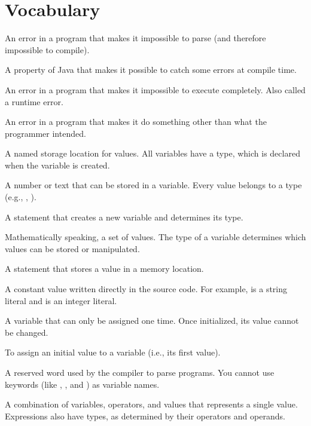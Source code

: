 \section{Vocabulary}

\begin{description}

An error in a program that makes it impossible to parse (and therefore impossible to compile).

A property of Java that makes it possible to catch some errors at compile time.

An error in a program that makes it impossible to execute completely.
Also called a runtime error.

An error in a program that makes it do something other than what the programmer intended.

A named storage location for values.
All variables have a type, which is declared when the variable is created.

A number or text that can be stored in a variable.
Every value belongs to a type (e.g., , ).

A statement that creates a new variable and determines its type.

Mathematically speaking, a set of values.
The type of a variable determines which values can be stored or manipulated.

A statement that stores a value in a memory location.

A constant value written directly in the source code.
For example,  is a string literal and  is an integer literal.

A variable that can only be assigned one time.
Once initialized, its value cannot be changed.

To assign an initial value to a variable (i.e., its first value).

A reserved word used by the compiler to parse programs.
You cannot use keywords (like , , and ) as variable names.

A combination of variables, operators, and values that represents a single value.
Expressions also have types, as determined by their operators and operands.


\end{description}
